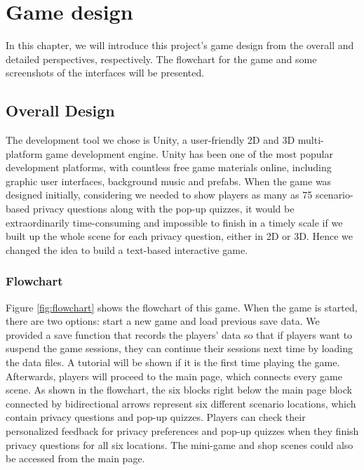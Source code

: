 \documentclass[msc,deptreport,ai]{infthesis}      %
\begin{document}
\chapter{Game design}

In this chapter, we will introduce this project's game design from the overall and detailed perspectives, respectively. The flowchart for the game and some screenshots of the interfaces will be presented.

\section{Overall Design}

The development tool we chose is Unity, a user-friendly 2D and 3D multi-platform game development engine. Unity has been one of the most popular development platforms, with countless free game materials online, including graphic user interfaces, background music and prefabs. When the game was designed initially, considering we needed to show players as many as 75 scenario-based privacy questions along with the pop-up quizzes, it would be extraordinarily time-consuming and impossible to finish in a timely scale if we built up the whole scene for each privacy question, either in 2D or 3D. Hence we changed the idea to build a text-based interactive game. 

\subsection{Flowchart}
Figure \ref{fig:flowchart} shows the flowchart of this game. When the game is started, there are two options: start a new game and load previous save data. We provided a save function that records the players' data so that if players want to suspend the game sessions, they can continue their sessions next time by loading the data files. A tutorial will be shown if it is the first time playing the game. Afterwards, players will proceed to the main page, which connects every game scene. As shown in the flowchart, the six blocks right below the main page block connected by bidirectional arrows represent six different scenario locations, which contain privacy questions and pop-up quizzes. Players can check their personalized feedback for privacy preferences and pop-up quizzes when they finish privacy questions for all six locations. The mini-game and shop scenes could also be accessed from the main page.
\end{document}
